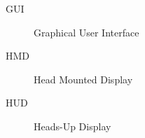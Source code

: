 \begin{description}
	\item [GUI] Graphical User Interface
	\item [HMD] Head Mounted Display
	\item [HUD] Heads-Up Display
\end{description}
	